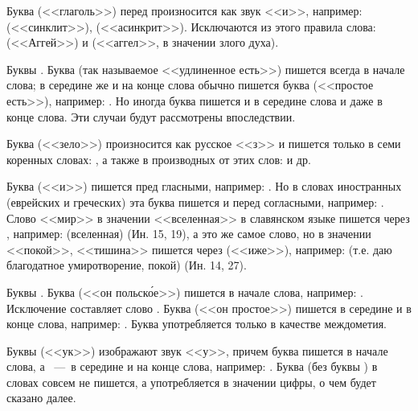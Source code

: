 \documentclass[11pt,a4paper,oneside]{memoir}
\begin{document}
        Буква {} (<<глаголь>>) перед {}
        произносится как звук <<и>>, например: {}
        (<<синклит>>), {} (<<асинкрит>>).
        Исключаются из этого правила слова: {}
        (<<Аггей>>) и {} (<<аггел>>, в значении злого духа).

        Буквы {}. Буква {} (так называемое
        <<удлиненное есть>>) пишется всегда в начале слова; в
        середине же и на конце слова обычно пишется буква {}
        (<<простое есть>>), например: {}. Но иногда буква {} пишется и в середине
        слова и даже в конце слова. Эти случаи будут рассмотрены впоследствии.

        Буква {} (<<зело>>) произносится как русское <<з>> и
        пишется только в семи коренных словах: {}, а также в производных
        от этих слов: {} и др.

        Буква {} (<<и>>) пишется пред гласными, например:
        {}. Но в словах иностранных (еврейских и
        греческих) эта буква пишется и перед согласными, например:
        {}. Слово <<мир>> в значении
        <<вселенная>> в славянском языке пишется через {},
        например: {} (вселенная) (Ин.
        15, 19), а это же самое слово, но в значении <<покой>>,
        <<тишина>> пишется через {} (<<иже>>), например:
        {} (т.е. даю благодатное
        умиротворение, покой) (Ин. 14, 27).

        Буквы {}. Буква {} (<<он польск\'ое>>)
        пишется в начале слова, например: {}.
        Исключение составляет слово {}. Буква
        {} (<<он простое>>) пишется в середине и в конце
        слова, например: {}. Буква {}
        употребляется только в качестве междометия.

        Буквы {} (<<ук>>) изображают звук <<у>>, причем
        буква {} пишется в начале слова, а {}~---~в
        середине и на конце слова, например: {}. Буква {} (без буквы {})
        в словах совсем не пишется, а употребляется в значении цифры,
        о чем будет сказано далее.
\end{document}
